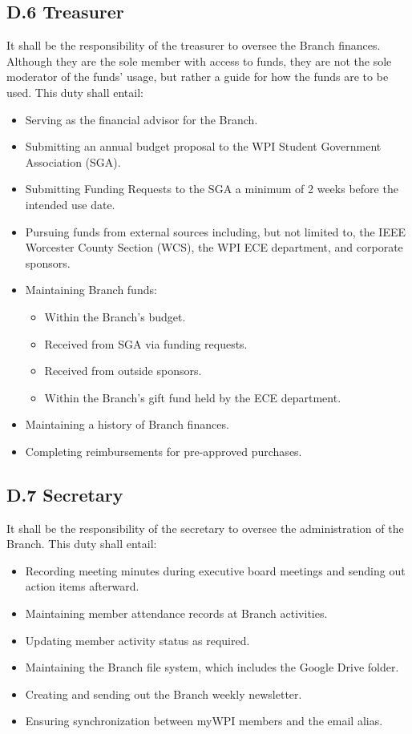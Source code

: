 \documentclass[11pt,a4paper]{article}
\begin{document}
\subsection*{D.6 Treasurer}
It shall be the responsibility of the treasurer to oversee the Branch finances. Although they are the sole member with access to funds, they are not the sole moderator of the funds' usage, but rather a guide for how the funds are to be used. This duty shall entail:
\begin{itemize}[noitemsep]
    \item Serving as the financial advisor for the Branch.
    \item Submitting an annual budget proposal to the WPI Student Government Association (SGA).
    \item Submitting Funding Requests to the SGA a minimum of 2 weeks before the intended use date.
    \item Pursuing funds from external sources including, but not limited to, the IEEE Worcester County Section (WCS), the WPI ECE department, and corporate sponsors.
    \item Maintaining Branch funds:
        \begin{itemize}[noitemsep]
            \item Within the Branch's budget.
            \item Received from SGA via funding requests.
            \item Received from outside sponsors.
            \item Within the Branch's gift fund held by the ECE department.
        \end{itemize}
    \item Maintaining a history of Branch finances.
    \item Completing reimbursements for pre-approved purchases.
    
\end{itemize}

\subsection*{D.7 Secretary}
It shall be the responsibility of the secretary to oversee the administration of the Branch. This duty shall entail:
\begin{itemize}[noitemsep]
    \item Recording meeting minutes during executive board meetings and sending out action items afterward.
    \item Maintaining member attendance records at Branch activities.
    \item Updating member activity status as required.
    \item Maintaining the Branch file system, which includes the Google Drive folder.
    \item Creating and sending out the Branch weekly newsletter.
    \item Ensuring synchronization between myWPI members and the email alias.
\end{itemize}
\end{document}

